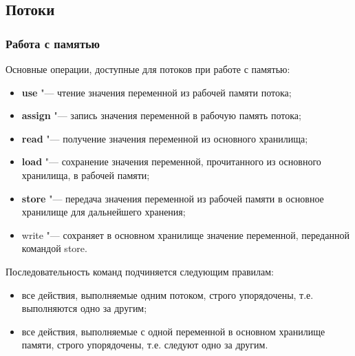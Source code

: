 \documentclass[default]{beamer}
\begin{document}
	\subsection{Потоки}
	\begin{frame}
		\frametitle{Работа с памятью}
		
		Основные операции, доступные для потоков при работе с памятью:
		\begin{itemize}
			\item \textbf{use} "--- чтение значения переменной из рабочей памяти потока;
			\item \textbf{assign} "--- запись значения переменной в рабочую память потока;
			\item \textbf{read} "--- получение значения переменной из основного хранилища;
			\item \textbf{load} "--- сохранение значения переменной, прочитанного из основного хранилища, в рабочей памяти;
			\item \textbf{store} "--- передача значения переменной из рабочей памяти в основное хранилище для дальнейшего хранения;
			\item write "--- сохраняет в основном хранилище значение переменной, переданной командой store.
		\end{itemize}
		
		Последовательность команд подчиняется следующим правилам:
		\begin{itemize}
			\item все действия, выполняемые одним потоком, строго упорядочены, т.е. выполняются одно за другим;
			\item все действия, выполняемые с одной переменной в основном хранилище памяти, строго упорядочены, т.е. следуют одно за другим.
		\end{itemize}
		
	\end{frame}
	
\end{document}
